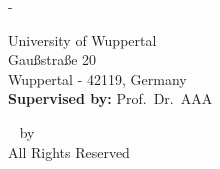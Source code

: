 \begin{titlingpage}
\begin{SingleSpace}
\begin{adjustwidth*}{\unitlength}{-\unitlength}
\begin{center}
{{\Large University of Wuppertal}\\
\vspace {1mm}
{Gau{\ss}stra{\ss}e 20}\\
\vspace {1mm}
{Wuppertal - 42119, Germany}
}\\
\vspace{15mm}
{\large \textbf{Supervised by:} Prof.~Dr.~AAA}
\vfill

\end{center}
\end{adjustwidth*}

\clearpage

\pagestyle{empty}
\null\vfill
\begin{center}
  {\textcopyright}~{\utsyear} by \href{utsurl}{\utsname}
  \\All Rights Reserved
\end{center}
\end{SingleSpace}
\end{titlingpage}